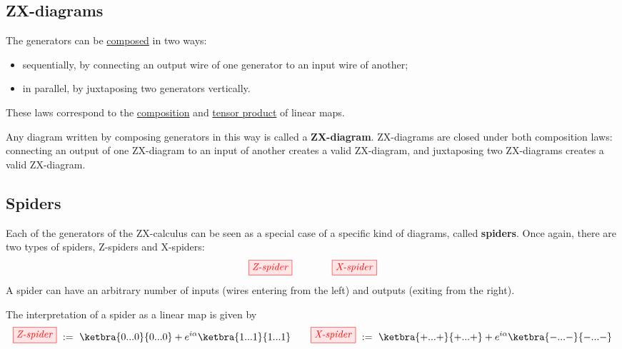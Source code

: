 \documentclass[a4paper, 12pt]{article}
\begin{document}


\subsection{ZX-diagrams}

The generators can be \underline{composed} in two ways:
\begin{itemize}
\item sequentially, by connecting an output wire of one generator to an input
  wire of another;
\item in parallel, by juxtaposing two generators vertically.
\end{itemize}
These laws correspond to the \underline{composition} and \underline{tensor
  product} of linear maps.

Any diagram written by composing generators in this way is called a
\textbf{ZX-diagram}.
ZX-diagrams are closed under both composition laws: connecting
an output of one ZX-diagram to an input of another creates a valid ZX-diagram,
and juxtaposing two ZX-diagrams creates a valid ZX-diagram.


\subsection{Spiders}

Each of the generators of the ZX-calculus can be seen as a special case of a
specific kind of diagrams, called \textbf{spiders}.
Once again, there are two types of spiders, Z-spiders and X-spiders:
\begin{equation*}
    \tikzfig{Z-spider} \qquad \qquad \tikzfig{X-spider}
\end{equation*}
A spider can have an arbitrary number of inputs (wires entering from the left)
and outputs (exiting from the right).

The interpretation of a spider as a linear map is given by
\begin{equation*}
    \tikzfig{Z-spider}\ := \ \ketbra{0...0}{0...0} +
e^{i \alpha} \ketbra{1...1}{1...1} \hfill
\qquad
\hfill \tikzfig{X-spider} \ := \ \ketbra{+...+}{+...+} +
e^{i \alpha} \ketbra{-...-}{-...-}
\end{equation*}
\end{document}
